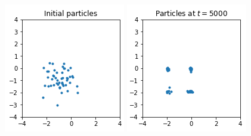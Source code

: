 \begin{figure}[ht]
\begin{center}
\hspace{-0.5em}
  \includegraphics[width=\linewidth]{img/init.png}
\endminipage\hfill
{}
  \includegraphics[width=\linewidth]{img/sgld.png}

\end{center}
\end{figure}
